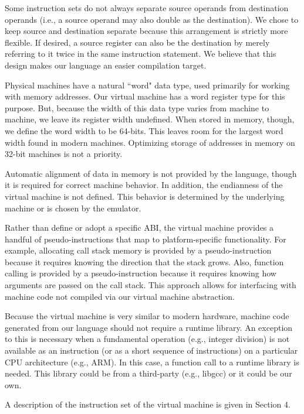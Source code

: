 Some instruction sets do not always separate source operands from
destination operands (i.e., a source operand may also double as the destination).
We chose to keep source and destination separate because this arrangement
is strictly more flexible. If desired, a source register can also be the
destination by merely referring to it twice in the same instruction statement.
We believe that this design makes our language an easier compilation target.

Physical machines have a natural ``word" data type, used primarily
for working with memory addresses. Our virtual machine has a word register
type for this purpose. But, because the width of this data type
varies from machine to machine, we leave its register width undefined.
When stored in memory, though, we define the word width to be 64-bits.
This leaves room for the largest word width found in modern machines.
Optimizing storage of addresses in memory on 32-bit machines
is not a priority.

Automatic alignment of data in memory is not provided by the language,
though it is required for correct machine behavior.
In addition, the endianness of the virtual machine is not defined. This behavior
is determined by the underlying machine or is chosen by the emulator.

Rather than define or adopt a specific ABI, the virtual machine provides a
handful of pseudo-instructions that map to platform-specific functionality.
For example, allocating call stack memory is provided by a pseudo-instruction
because it requires knowing the direction that the stack grows.
Also, function calling is provided by a pseudo-instruction because
it requires knowing how arguments are passed on the call stack.
This approach allows for interfacing with machine code not compiled
via our virtual machine abstraction.

Because the virtual machine is very similar to modern hardware,
machine code generated from our language should not require a
runtime library. An exception to this is necessary when a fundamental operation
(e.g., integer division) is not available as an instruction (or as a short
sequence of instructions) on a particular CPU architecture (e.g., ARM).
In this case, a function call to a runtime library is needed.
This library could be from a third-party (e.g., libgcc) or it could
be our own.

A description of the instruction set of the virtual machine
is given in Section 4.
